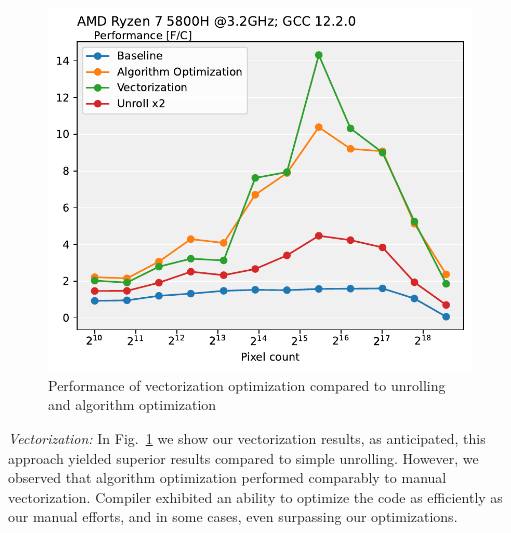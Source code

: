 \documentclass[letterpaper]{article}
\begin{document}
\begin{figure}[htb]
\centering
  \includegraphics[scale=0.5]{VectorizePlot.pdf}
  \caption{Performance of vectorization optimization compared to unrolling and algorithm optimization
  \label{vectorize}}
\end{figure}

\textit{Vectorization:} In Fig.~\ref{vectorize} we show our vectorization results, as anticipated, this approach yielded superior results compared to simple unrolling. However, we observed that algorithm optimization performed comparably to manual vectorization. Compiler exhibited an ability to optimize the code as efficiently as our manual efforts, and in some cases, even surpassing our optimizations.
\end{document}
